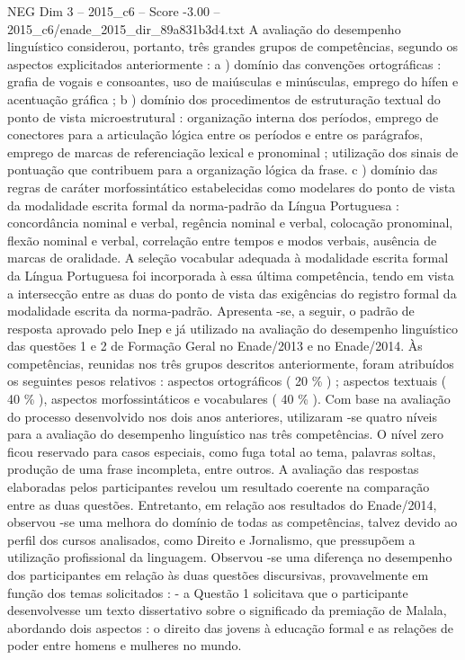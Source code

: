\begin{textsample}{NEG Dim 3 – 2015\_c6 – Score -3.00 – 2015\_c6/enade\_2015\_dir\_89a831b3d4.txt}
A avaliação do desempenho linguístico considerou, portanto, três grandes grupos de competências, segundo os aspectos explicitados anteriormente : a ) domínio das convenções ortográficas : grafia de vogais e consoantes, uso de maiúsculas e minúsculas, emprego do hífen e acentuação gráfica ; b ) domínio dos procedimentos de estruturação textual do ponto de vista microestrutural : organização interna dos períodos, emprego de conectores para a articulação lógica entre os períodos e entre os parágrafos, emprego de marcas de referenciação lexical e pronominal ; utilização dos sinais de pontuação que contribuem para a organização lógica da frase. c ) domínio das regras de caráter morfossintático estabelecidas como modelares do ponto de vista da modalidade escrita formal da norma-padrão da Língua Portuguesa : concordância nominal e verbal, regência nominal e verbal, colocação pronominal, flexão nominal e verbal, correlação entre tempos e modos verbais, ausência de marcas de oralidade.
A seleção vocabular adequada à modalidade escrita formal da Língua Portuguesa foi incorporada à essa última competência, tendo em vista a intersecção entre as duas do ponto de vista das exigências do registro formal da modalidade escrita da norma-padrão.
Apresenta -se, a seguir, o padrão de resposta aprovado pelo Inep e já utilizado na avaliação do desempenho linguístico das questões 1 e 2 de Formação Geral no Enade/2013 e no Enade/2014.
Às competências, reunidas nos três grupos descritos anteriormente, foram atribuídos os seguintes pesos relativos : aspectos ortográficos ( 20 \% ) ; aspectos textuais ( 40 \% ), aspectos morfossintáticos e vocabulares ( 40 \% ).
Com base na avaliação do processo desenvolvido nos dois anos anteriores, utilizaram -se quatro níveis para a avaliação do desempenho linguístico nas três competências.
O nível zero ficou reservado para casos especiais, como fuga total ao tema, palavras soltas, produção de uma frase incompleta, entre outros.
A avaliação das respostas elaboradas pelos participantes revelou um resultado coerente na comparação entre as duas questões.
Entretanto, em relação aos resultados do Enade/2014, observou -se uma melhora do domínio de todas as competências, talvez devido ao perfil dos cursos analisados, como Direito e Jornalismo, que pressupõem a utilização profissional da linguagem.
Observou -se uma diferença no desempenho dos participantes em relação às duas questões discursivas, provavelmente em função dos temas solicitados : - a Questão 1 solicitava que o participante desenvolvesse um texto dissertativo sobre o significado da premiação de Malala, abordando dois aspectos : o direito das jovens à educação formal e as relações de poder entre homens e mulheres no mundo.

\end{textsample}
